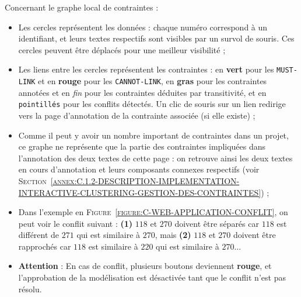 		Concernant le graphe local de contraintes :
		\begin{itemize}
			\item Les cercles représentent les données : chaque numéro correspond à un identifiant, et leurs textes respectifs sont visibles par un survol de souris.
			Ces cercles peuvent être déplacés pour une meilleur visibilité ;
			\item Les liens entre les cercles représentent les contraintes : en \textcolor{colorApplicationMUSTLINK}{\textbf{vert}} pour les \texttt{MUST-LINK} et en \textcolor{colorApplicationCANNOTLINK}{\textbf{rouge}} pour les \texttt{CANNOT-LINK}, en \textbf{gras} pour les contraintes annotées et en \textit{fin} pour les contraintes déduites par transitivité, et en \texttt{pointillés} pour les conflits détectés.
			Un clic de souris sur un lien redirige vers la page d'annotation de la contrainte associée (si elle existe) ;
			\item Comme il peut y avoir un nombre important de contraintes dans un projet, ce graphe ne représente que la partie des contraintes impliquées dans l'annotation des deux textes de cette page : on retrouve ainsi les deux textes en cours d'annotation et leurs composants connexes respectifs (voir \textsc{Section~\ref{annex:C.1.2-DESCRIPTION-IMPLEMENTATION-INTERACTIVE-CLUSTERING-GESTION-DES-CONTRAINTES}}) ;
			\item Dans l'exemple en \textsc{Figure~\ref{figure:C-WEB-APPLICATION-CONFLIT}}, on peut voir le conflit suivant : \textbf{(1)} $118$ et $270$ doivent être séparés car $118$ est différent de $271$ qui est similaire à $270$, mais \textbf{(2)} $118$ et $270$ doivent être rapprochés car $118$ est similaire à $220$ qui est similaire à $270$...
			\item \textbf{Attention} : En cas de conflit, plusieurs boutons deviennent \textcolor{colorApplicationERROR}{\textbf{rouge}}, et l'approbation de la modélisation est désactivée tant que le conflit n'est pas résolu.
		\end{itemize}